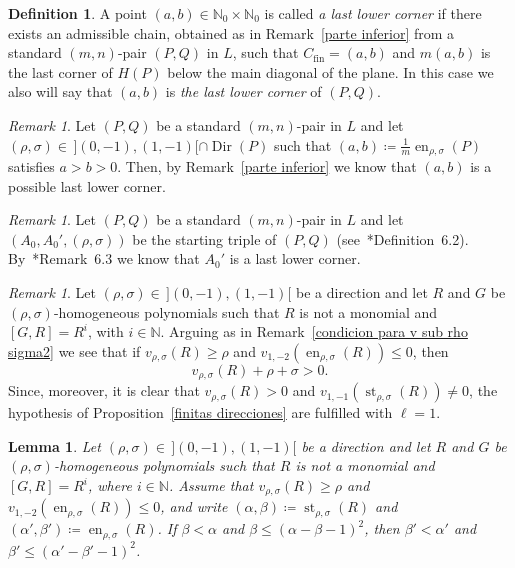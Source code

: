 \documentclass[reqno,a4paper]{amsart}
\newtheorem{lemma}[theorem]{Lemma}
\theoremstyle{definition}
\newtheorem{definition}[theorem]{Definition}
\theoremstyle{remark}
\newtheorem{remark}[theorem]{Remark}
\DeclareMathOperator{\en}{en}
\DeclareMathOperator{\st}{st}
\DeclareMathOperator{\Dir}{Dir}
\begin{document}
\begin{definition}\label{llc} A point $(a,b)\in \mathds{N}_0\times\mathds{N}_0$ is called {\em a last lower corner} if there exists an admissible chain, obtained as in Remark~\ref{parte inferior} from a standard $(m,n)$-pair $(P,Q)$ in $L$, such that $C_{\text{fin}}=(a,b)$ and $m(a,b)$ is the last corner of $H(P)$ below the main diagonal of the plane. In this case we also will say that $(a,b)$ is {\em the last lower corner} of $(P,Q)$.
\end{definition}

\begin{remark}\label{Con Jac falsa} Let $(P,Q)$ be a standard $(m,n)$-pair in $L$ and let $(\rho,\sigma)\in\hspace{2pt} ](0,-1),(1,-1)[\cap \Dir(P)$ such that $(a,b)\coloneqq \frac 1m\en_{\rho,\sigma}(P)$ satisfies $a>b>0$. Then, by Remark~\ref{parte inferior} we know that $(a,b)$ is a possible last lower corner.
\end{remark}

\begin{remark}\label{Con Jac falsa starting triple} Let $(P,Q)$ be a standard $(m,n)$-pair in $L$ and let $(A_0,A_0',(\rho,\sigma))$ be the starting triple of $(P,Q)$ (see~\cite{GGV}*{Definition~6.2}). By~\cite{GGV}*{Remark~6.3} we know that $A_0'$ is a last lower corner.
\end{remark}

\begin{remark}\label{para prop 2.18} Let $(\rho,\sigma)\in\hspace{2pt} ](0,-1),(1,-1)[$ be a direction and let $R$ and $G$ be $(\rho,\sigma)$-ho\-mo\-ge\-neous polynomials such that $R$ is not a monomial and $[G,R]= R^i$, with $i\in \mathds{N}$. Arguing as in Re\-mark~\ref{condicion para v sub rho sigma2} we see that if $v_{\rho,\sigma}(R)\ge \rho$ and $v_{1,-2}(\en_{\rho,\sigma}(R))\le 0$, then
$$
v_{\rho,\sigma}(R)+\rho+\sigma>0.
$$
Since, moreover, it is clear that $v_{\rho,\sigma}(R)>0$ and $v_{1,-1}(\st_{\rho,\sigma}(R))\ne 0$, the hypothesis of Proposition~\ref{finitas direcciones} are fulfilled with $\ell=1$.
\end{remark}

\begin{lemma}\label{para la cota} Let $(\rho,\sigma)\in\hspace{2pt} ](0,-1),(1,-1)[$ be a direction and let $R$ and $G$ be $(\rho,\sigma)$-ho\-mo\-ge\-neous polynomials such that $R$ is not a monomial and $[G,R]= R^i$, where $i\in \mathds{N}$. Assume that $v_{\rho,\sigma}(R)\ge \rho$ and $v_{1,-2}(\en_{\rho,\sigma}(R))\le 0$, and write $(\alpha,\beta)\coloneqq  \st_{\rho,\sigma}(R)$ and $(\alpha',\beta')\coloneqq \en_{\rho,\sigma}(R)$. If $\beta<\alpha$ and $\beta\le (\alpha - \beta - 1)^2$, then  $\beta'<\alpha'$ and $\beta'\le (\alpha' - \beta' - 1)^2$.
\end{lemma}
\end{document}
